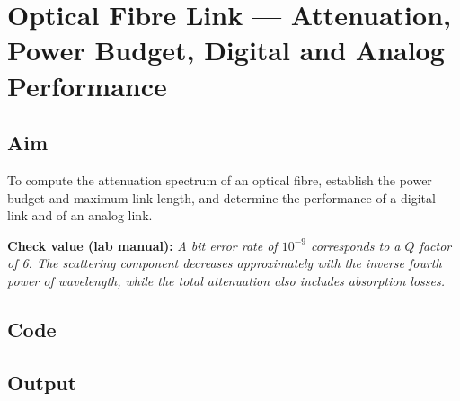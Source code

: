 \documentclass[11pt,a4paper]{article}
\newcommand{\experiment}[4]{%
  \clearpage
  \section{#2}
  \subsection{Aim}
  #3
  \par\smallskip
  {\small\textbf{Check value (lab manual):} \emph{#4}}
  \subsection{Code}
  
  \subsection{Output}
  }
\begin{document}
\experiment{15}{Optical Fibre Link --- Attenuation, Power Budget, Digital and Analog Performance}
{To compute the attenuation spectrum of an optical fibre, establish the power budget and maximum link
length, and determine the performance of a digital link and of an analog link.}
{A bit error rate of $10^{-9}$ corresponds to a $Q$ factor of 6. The scattering component decreases
approximately with the inverse fourth power of wavelength, while the total attenuation also includes
absorption losses.}
\end{document}
